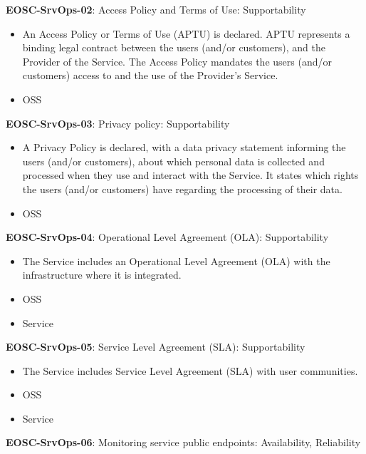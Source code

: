 \textbf{EOSC-SrvOps-02}: Access Policy and Terms of Use: Supportability

\begin{itemize}
    \item An Access Policy or Terms of Use (APTU) is declared. APTU represents a binding legal contract between the users (and/or customers), and the Provider of the Service. The Access Policy mandates the users (and/or customers) access to and the use of the Provider's Service. \cite{orviz_fernandez_eosc-synergy_2020}
    \item OSS
\end{itemize}

\textbf{EOSC-SrvOps-03}: Privacy policy: Supportability

\begin{itemize}
    \item A Privacy Policy is declared, with a data privacy statement informing the users (and/or customers), about which personal data is collected and processed when they use and interact with the Service. It states which rights the users (and/or customers) have regarding the processing of their data. \cite{orviz_fernandez_eosc-synergy_2020}
    \item OSS
\end{itemize}

\textbf{EOSC-SrvOps-04}: Operational Level Agreement (OLA): Supportability

\begin{itemize}
    \item The Service includes an Operational Level Agreement (OLA) with the infrastructure where it is integrated. \cite{orviz_fernandez_eosc-synergy_2020}
    \item OSS
    \item Service
\end{itemize}

\textbf{EOSC-SrvOps-05}: Service Level Agreement (SLA): Supportability

\begin{itemize}
    \item The Service includes Service Level Agreement (SLA) with user communities. \cite{orviz_fernandez_eosc-synergy_2020}
    \item OSS
    \item Service
\end{itemize}

\textbf{EOSC-SrvOps-06}: Monitoring service public endpoints: Availability, Reliability

